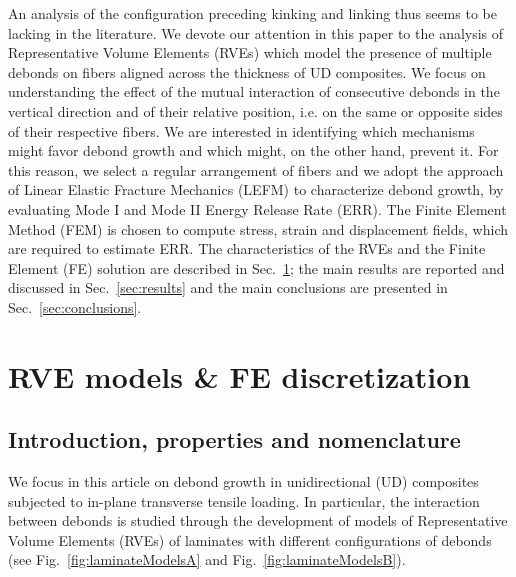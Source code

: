 \documentclass[smallextended]{svjour3}       %
\begin{document}
An analysis of the configuration preceding kinking and linking thus seems to be lacking in the literature. We devote our attention in this paper to the analysis of Representative Volume Elements (RVEs) which model the presence of multiple debonds on fibers aligned across the thickness of UD composites. We focus on understanding the effect of the mutual interaction of consecutive debonds in the vertical direction and of their relative position, i.e. on the same or opposite sides of their respective fibers. We are interested in identifying which mechanisms might favor debond growth and which might, on the other hand, prevent it. For this reason, we select a regular arrangement of fibers and we adopt the approach of Linear Elastic Fracture Mechanics (LEFM) to characterize debond growth, by evaluating Mode I and Mode II Energy Release Rate (ERR). The Finite Element Method (FEM) is chosen to compute stress, strain and displacement fields, which are required to estimate ERR. The characteristics of the RVEs and the Finite Element (FE) solution are described in Sec.~\ref{sec:rveFem}; the main results are reported and discussed in Sec.~\ref{sec:results} and the main conclusions are presented in Sec.~\ref{sec:conclusions}.


\section{RVE models \& FE discretization}\label{sec:rveFem}

\subsection{Introduction, properties and nomenclature}\label{subsec:names}

We focus in this article on debond growth in unidirectional (UD) composites subjected to in-plane transverse tensile loading. In particular, the interaction between debonds is studied through the development of models of Representative Volume Elements (RVEs) of laminates with different configurations of debonds (see Fig.~\ref{fig:laminateModelsA} and Fig.~\ref{fig:laminateModelsB}).
\end{document}
